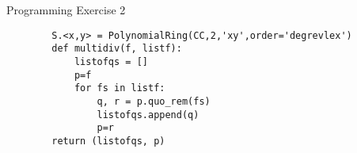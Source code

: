 \documentclass[12pt]{article}
\begin{document}
Programming Exercise 2
\begin{mybox}
    \begin{lstlisting}
        S.<x,y> = PolynomialRing(CC,2,'xy',order='degrevlex')
        def multidiv(f, listf):
            listofqs = []
            p=f
            for fs in listf:
                q, r = p.quo_rem(fs)
                listofqs.append(q)
                p=r
        return (listofqs, p)
    \end{lstlisting}
\end{mybox}
\end{document}

